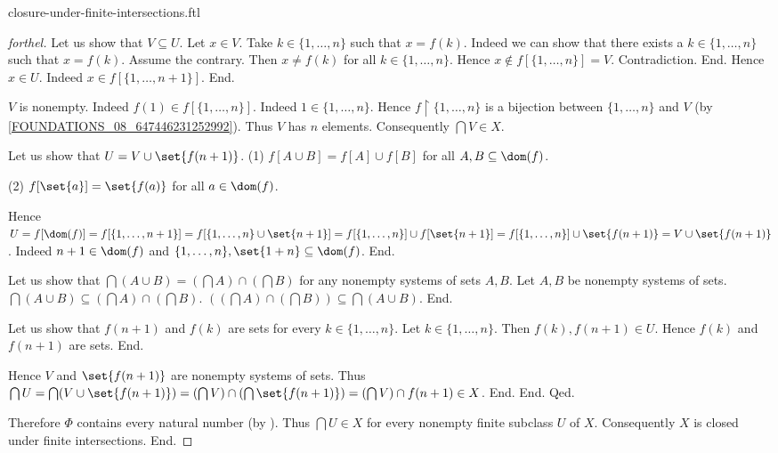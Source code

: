 \documentclass{naproche-library}
\begin{document}
\begin{smodule}{closure-under-finite-intersections.ftl}
\begin{proof}[forthel]
            Let us show that $V \subseteq U$.
              Let $x \in V$.
              Take $k \in \{ 1, \dots, n \}$ such that $x = f(k)$.
              Indeed we can show that there exists a $k \in \{ 1, \dots, n \}$ such that $x = f(k)$.
                Assume the contrary.
                Then $x \neq f(k)$ for all $k \in \{ 1, \dots, n \}$.
                Hence $x \notin f[\{ 1, \dots, n \}] = V$.
                Contradiction.
              End.
              Hence $x \in U$.
              Indeed $x \in f[\{ 1, \dots, n + 1 \}]$.
            End.

            $V$ is nonempty.
            Indeed $f(1) \in f[\{ 1, \dots, n \}]$.
            Indeed $1 \in \{ 1, \dots, n \}$.
            Hence $f \restriction \{ 1, \dots, n \}$ is a bijection between $\{ 1, \dots, n \}$ and $V$ (by \cref{FOUNDATIONS_08_647446231252992}).
            Thus $V$ has $n$ elements.
            Consequently $\bigcap V \in X$.

            Let us show that $U = V \cup \set{f(n + 1)}$. \newline
              (1) $f[A \cup B] = f[A] \cup f[B]$ for all $A, B \subseteq \dom(f)$.

              (2) $f[\set{a}] = \set{f(a)}$ for all $a \in \dom(f)$.

              Hence $U
                = f[\dom(f)]
                = f[\{ 1, \dots, n + 1 \}]
                = f[\{ 1, \dots, n \} \cup \set{n + 1}]
                = f[\{ 1, \dots, n \}] \cup f[\set{n + 1}]
                = f[\{ 1, \dots, n \}] \cup \set{f(n + 1)}
                = V \cup \set{f(n + 1)}$.
              Indeed $n + 1 \in \dom(f)$ and $\{ 1, \dots, n \}, \set{1 + n} \subseteq \dom(f)$.
            End.

            Let us show that $\bigcap (A \cup B) = (\bigcap A) \cap (\bigcap B)$ for any nonempty systems of sets $A, B$.
              Let $A, B$ be nonempty systems of sets.
              $\bigcap (A \cup B) \subseteq (\bigcap A) \cap (\bigcap B)$.
              $((\bigcap A) \cap (\bigcap B)) \subseteq \bigcap (A \cup B)$. %
            End.

            Let us show that $f(n + 1)$ and $f(k)$ are sets for every $k \in \{ 1, \dots, n \}$.
              Let $k \in \{ 1, \dots, n \}$.
              Then $f(k), f(n + 1) \in U$.
              Hence $f(k)$ and $f(n + 1)$ are sets.
            End.

            Hence $V$ and $\set{f(n + 1)}$ are nonempty systems of sets.
            Thus $\bigcap U
              = \bigcap (V \cup \set{f(n + 1)})
              = (\bigcap V) \cap (\bigcap \set{f(n + 1)})
              = (\bigcap V) \cap f(n + 1)
              \in X$.
          End.
        End.
      Qed.

      Therefore $\Phi$ contains every natural number (by ).
      Thus $\bigcap U \in X$ for every nonempty finite subclass $U$ of $X$.
      Consequently $X$ is closed under finite intersections.
    End.
  \end{proof}
\end{smodule}
\end{document}
